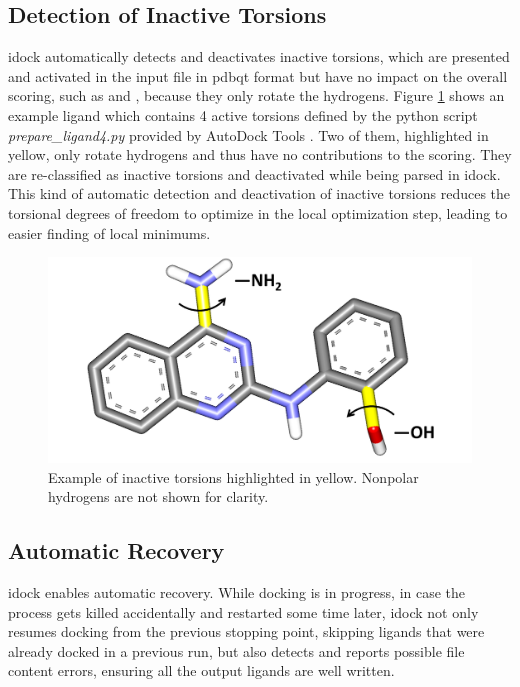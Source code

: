 \subsection{Detection of Inactive Torsions}

idock automatically detects and deactivates inactive torsions, which are presented and activated in the input file in pdbqt format but have no impact on the overall scoring, such as  and , because they only rotate the hydrogens. Figure \ref{idock:InactiveTorsions} shows an example ligand which contains 4 active torsions defined by the python script \textit{prepare\_ligand4.py} provided by AutoDock Tools \cite{785,596}. Two of them, highlighted in yellow, only rotate hydrogens and thus have no contributions to the scoring. They are re-classified as inactive torsions and deactivated while being parsed in idock. This kind of automatic detection and deactivation of inactive torsions reduces the torsional degrees of freedom to optimize in the local optimization step, leading to easier finding of local minimums.

\begin{figure}
\centering
\includegraphics[width=\linewidth]{idock/InactiveTorsions.png}
\caption{Example of inactive torsions highlighted in yellow. Nonpolar hydrogens are not shown for clarity.}
\label{idock:InactiveTorsions}
\end{figure}

\subsection{Automatic Recovery}

idock enables automatic recovery. While docking is in progress, in case the process gets killed accidentally and restarted some time later, idock not only resumes docking from the previous stopping point, skipping ligands that were already docked in a previous run, but also detects and reports possible file content errors, ensuring all the output ligands are well written.

